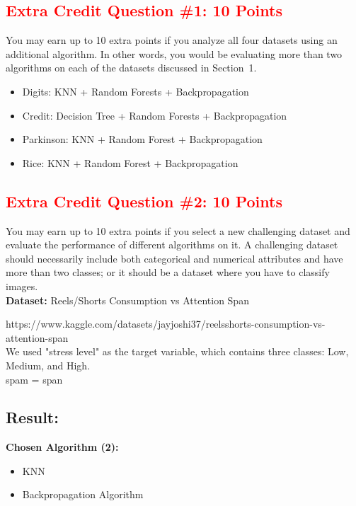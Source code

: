 \documentclass[11pt]{article}
\begin{document}
\textcolor{red}{\subsection*{Extra Credit Question \#1: 10 Points}}

You may earn up to 10 extra points if you analyze all four datasets using an additional algorithm. In other words, you would be evaluating more than two algorithms on each of the datasets discussed in Section~1.

\begin{itemize}
    \item Digits: KNN + Random Forests + Backpropagation
    \item Credit: Decision Tree + Random Forests + Backpropagation
    \item Parkinson: KNN + Random Forest + Backpropagation
    \item Rice: KNN + Random Forest + Backpropagation
\end{itemize}

\newpage
\textcolor{red}{\subsection*{Extra Credit Question \#2: 10 Points}}

You may earn up to 10 extra points if you select a new challenging dataset and evaluate the performance of different algorithms on it. A challenging dataset should necessarily include both categorical and numerical attributes and have more than two classes; or it should be a dataset where you have to classify images.\\

\noindent \textbf{Dataset:} Reels/Shorts Consumption vs Attention Span

\noindent https://www.kaggle.com/datasets/jayjoshi37/reelsshorts-consumption-vs-attention-span\\

\noindent We used "stress level" as the target variable, which contains three classes: Low, Medium, and High.\\

\noindent spam = span\\


\noindent \subsection*{Result:}

\noindent \textbf{Chosen Algorithm (2):}
\begin{itemize}
    \item KNN
    \item Backpropagation Algorithm
\end{itemize}
\end{document}
